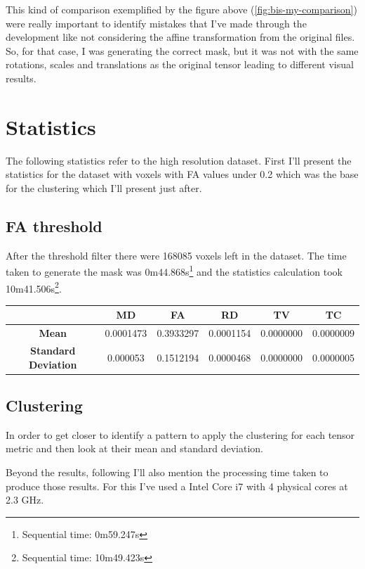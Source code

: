 \documentclass[a4paper,11pt]{report}
\begin{document}
  This kind of comparison exemplified by the figure above (\ref{fig:bis-my-comparison}) were really important to identify mistakes that I've made through the development like not considering the affine transformation from the original files. So, for that case, I was generating the correct mask, but it was not with the same rotations, scales and translations as the original tensor leading to different visual results.

  \section{Statistics}
  The following statistics refer to the high resolution dataset. First I'll present the statistics for the dataset with voxels with FA values under 0.2 which was the base for the clustering which I'll present just after.

    \subsection{FA threshold}\label{subsec:fa-threshold}
    After the threshold filter there were 168085 voxels left in the dataset. The time taken to generate the mask was 0m44.868s\footnote{Sequential time: 0m59.247s} and the statistics calculation took 10m41.506s\footnote{Sequential time: 10m49.423s}.

    \begin{tabular}{| c | c | c | c | c | c |}
      \hline
        & \textbf{MD} & \textbf{FA} & \textbf{RD} & \textbf{TV} & \textbf{TC} \\ \hline
       \textbf{Mean} & 0.0001473 & 0.3933297 & 0.0001154 & 0.0000000 & 0.0000009 \\ \hline
       \textbf{Standard Deviation} & 0.000053 & 0.1512194 & 0.0000468 & 0.0000000 & 0.0000005 \\ \hline 
    \end{tabular}

    \subsection{Clustering}\label{subsec:clustering}
    In order to get closer to identify a pattern to apply the clustering for each tensor metric and then look at their mean and standard deviation.

    Beyond the results, following I'll also mention the processing time taken to produce those results. For this I've used a Intel Core i7 with 4 physical cores at 2.3 GHz.
\end{document}
